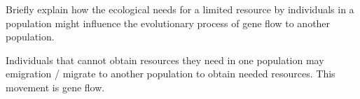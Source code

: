 \question[5]
Briefly explain how the ecological needs for a limited resource by individuals in a population might influence the evolutionary process of gene flow to another population.

\begin{solution}

Individuals that cannot obtain resources they need in one population may emigration / migrate to another population to obtain needed resources. This movement is gene flow.

\end{solution}